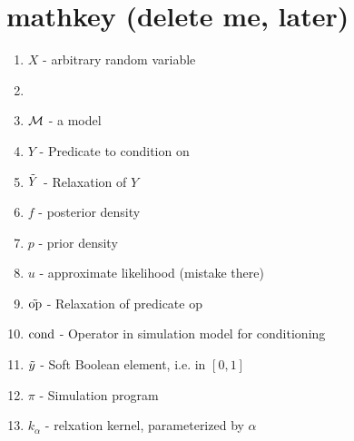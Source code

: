 \section{mathkey (delete me, later)}

\begin{enumerate}
\item $X$ - arbitrary random variable
\item \item ${\mathcal{M}}$ - a model
\item $Y$ - Predicate to condition on
\item $\mathrel{\tilde{Y}}$ - Relaxation of $Y$ 
\item $f$ - posterior density
\item $p$ - prior density
\item $u$ - approximate likelihood (mistake there)
\item $\mathrel{\tilde{\textrm{op}}}$ - Relaxation of predicate $\textrm{op}$
\item $\operatorname{cond}$ - Operator in simulation model for conditioning
\item $\mathrel{\tilde{y}}$ - Soft Boolean element, i.e. in $[0, 1]$
\item $\pi$ - Simulation program
\item $k_\alpha$ - relxation kernel, parameterized by $\alpha$
\end{enumerate}